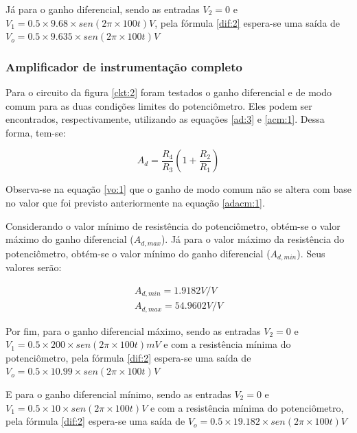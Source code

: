 Já para o ganho diferencial, sendo as entradas $V_2=0$ e $V_1=0.5 \times 9.68 \times sen(2 \pi \times 100t) V$, pela fórmula \ref{dif:2} espera-se uma saída de $V_o = 0.5 \times 9.635 \times sen(2 \pi \times 100t) V$

\subsubsection{Amplificador de instrumentação completo}

Para o circuito da figura \ref{ckt:2} foram testados o ganho diferencial e de modo comum para as duas condições limites do potenciômetro. Eles podem ser encontrados, respectivamente, utilizando as equações \ref{ad:3} e \ref{acm:1}. Dessa forma, tem-se:

\begin{center}
\begin{equation} \label{ad:3}
        A_d = \frac{R_4}{R_3}\left( 1+\frac{R_2}{R_1}\right)
\end{equation}
\end{center}

Observa-se na equação \ref{vo:1} que o ganho de modo comum não se altera com base no valor que foi previsto anteriormente na equação \ref{adacm:1}. 

Considerando o valor mínimo de resistência do potenciômetro, obtém-se o valor máximo do ganho diferencial ($A_{d,max}$). Já para o valor máximo da resistência do potenciômetro, obtém-se o valor mínimo do ganho diferencial ($A_{d,min}$). Seus valores serão:

\begin{equation} \label{adacm:2}
\begin{aligned}
        A_{d,min} = 1.9182 V/V \\ 
        A_{d,max} = 54.9602 V/V
\end{aligned}
\end{equation}

Por fim, para o ganho diferencial máximo, sendo as entradas $V_2=0$ e $V_1=0.5 \times 200 \times sen(2 \pi \times 100t) mV$ e com a resistência mínima do potenciômetro, pela fórmula \ref{dif:2} espera-se uma saída de $V_o = 0.5 \times 10.99 \times sen(2 \pi \times 100t) V$

E para o ganho diferencial mínimo, sendo as entradas $V_2=0$ e $V_1=0.5 \times 10 \times sen(2 \pi \times 100t) V$ e com a resistência mínima do potenciômetro, pela fórmula \ref{dif:2} espera-se uma saída de $V_o = 0.5 \times 19.182 \times sen(2 \pi \times 100t) V$

